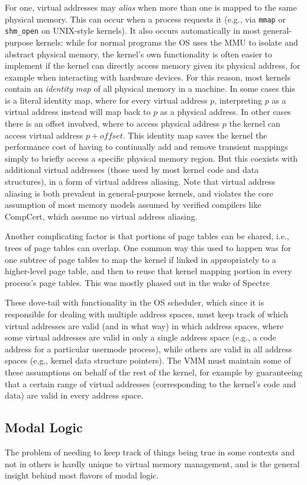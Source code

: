 For one, virtual addresses may \emph{alias} when more than one is mapped to the same physical memory. This can occur when a process requests it (e.g., via \texttt{mmap} or \texttt{shm\_open} on UNIX-style kernels). It also occurs automatically in most general-purpose kernels: while for normal programs the OS uses the MMU to isolate and abstract physical memory, the kernel's own functionality is often easier to implement if the kernel can directly access memory given its physical address, for example when interacting with hardware devices. For this reason, most kernels contain an \emph{identity map} of all physical memory in a machine. In some cases this is a literal identity map, where for every virtual address $p$, interpreting $p$ as a virtual address instead will map back to $p$ as a physical address. In other cases there is an offset involved, where to access physical address $p$ the kernel can access virtual address $p+\mathit{offset}$. This identity map saves the kernel the performance cost of having to continually add and remove transient mappings simply to briefly access a specific physical memory region. But this coexists with additional virtual addresses (those used by most kernel code and data structures), in a form of virtual address aliasing. Note that virtual address aliasing is both prevalent in general-purpose kernels, and violates the core assumption of most memory models assumed by verified compilers like CompCert, which assume no virtual address aliasing.

Another complicating factor is that portions of page tables can be shared, i.e., trees of page tables can overlap. One common way this used to happen was for one subtree of page tables to map the kernel if linked in appropriately to a higher-level page table, and then to reuse that kernel mapping portion in every process's page tables. This was mostly phased out in the wake of Spectre

These dove-tail with functionality in the OS scheduler, which since it is responsible for dealing with multiple address spaces, must keep track of which virtual addresses are valid (and in what way) in which address spaces, where some virtual addresses are valid in only a single address space (e.g., a code address for a particular usermode process), while others are valid in all address spaces (e.g., kernel data structure pointers). The VMM must maintain some of these assumptions on behalf of the rest of the kernel, for example by guaranteeing that a certain range of virtual addresses (corresponding to the kernel's code and data) are valid in every address space.

\subsection{Modal Logic}
\label{sec:backgroundonmodallogic}
The problem of needing to keep track of things being true in some contexts and not in others is hardly unique to virtual memory management, and is the general insight behind most flavors of modal logic.
